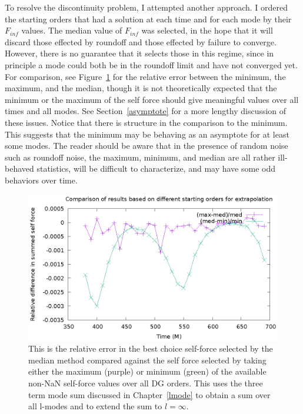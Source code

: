 To resolve the discontinuity problem, I attempted another approach. I ordered the starting orders that had a solution at each time and for each mode by their $F_{inf}$ values. The median value of $F_{inf}$ was selected, in the hope that it will discard those effected by roundoff and those effected by failure to converge. However, there is no guarantee that it selects those in this regime, since in principle a mode could both be in the roundoff limit and have not converged yet. For comparison, see Figure~\ref{relerrmaxminmed} for the relative error between the minimum, the maximum, and the median, though it is not theoretically expected that the minimum or the maximum of the self force should give meaningful values over all times and all modes. See Section~\ref{asymptote} for a more lengthy discussion of these issues. Notice that there is structure in the comparison to the minimum. This suggests that the minimum may be behaving as an asymptote for at least some modes. The reader should be aware that in the presence of random noise such as roundoff noise, the maximum, minimum, and median are all rather ill-behaved statistics, will be difficult to characterize, and may have some odd behaviors over time. 

\begin{figure}
\includegraphics{minmaxmedrelativeerror3termavgl}
\caption{This is the relative error in the best choice self-force selected by the median method compared against the self force selected by taking either the maximum (purple) or minimum (green) of the available non-NaN self-force values over all DG orders. This uses the three term mode sum discussed in Chapter~\ref{lmode} to obtain a sum over all l-modes and to extend the sum to $l=\infty$.} 
\label{relerrmaxminmed}
\end{figure}

